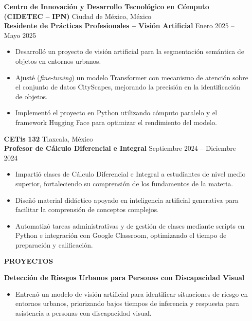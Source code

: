 \documentclass[11pt]{article}
\newcommand{\seccion}[1]{%
    \vspace{4pt}
    \begin{center}
        \textbf{\MakeUppercase{#1}}
    \end{center}
    \vspace{-10pt}
    \hrulefill
    \vspace{2pt}
}
\begin{document}
\vspace{8pt}

\textbf{Centro de Innovación y Desarrollo Tecnológico en Cómputo (CIDETEC -- IPN)} \hfill Ciudad de México, México\\
\textbf{Residente de Prácticas Profesionales -- Visión Artificial} \hfill Enero 2025 -- Mayo 2025
\begin{itemize}[noitemsep, topsep=2pt, partopsep=0pt, parsep=2pt, leftmargin=0.55cm]
    \item Desarrolló un proyecto de visión artificial para la segmentación semántica de objetos en entornos urbanos.
    \item Ajusté (\textit{fine-tuning}) un modelo Transformer con mecanismo de atención sobre el conjunto de datos CityScapes, mejorando la precisión en la identificación de objetos.
    \item Implementó el proyecto en Python utilizando cómputo paralelo y el framework Hugging Face para optimizar el rendimiento del modelo.
\end{itemize}

\vspace{8pt}

\textbf{CETis 132} \hfill Tlaxcala, México\\
\textbf{Profesor de Cálculo Diferencial e Integral} \hfill Septiembre 2024 -- Diciembre 2024
\begin{itemize}[noitemsep, topsep=2pt, partopsep=0pt, parsep=2pt, leftmargin=0.55cm]
    \item Impartió clases de Cálculo Diferencial e Integral a estudiantes de nivel medio superior, fortaleciendo su comprensión de los fundamentos de la materia.
    \item Diseñó material didáctico apoyado en inteligencia artificial generativa para facilitar la comprensión de conceptos complejos.
    \item Automatizó tareas administrativas y de gestión de clases mediante scripts en Python e integración con Google Classroom, optimizando el tiempo de preparación y calificación.
\end{itemize}
 \newpage
\seccion{Proyectos}

\textbf{Detección de Riesgos Urbanos para Personas con Discapacidad Visual}
\begin{itemize}[noitemsep, topsep=2pt, partopsep=0pt, parsep=2pt, leftmargin=0.55cm]
    \item Entrenó un modelo de visión artificial para identificar situaciones de riesgo en entornos urbanos, priorizando bajos tiempos de inferencia y respuesta para asistencia a personas con discapacidad visual.
\end{itemize}
\end{document}
